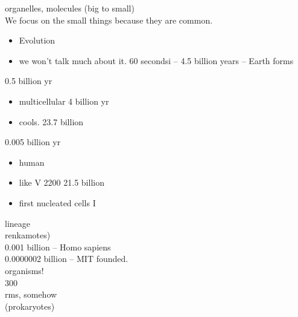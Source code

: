 organelles, molecules (big to small)\\
We focus on the small things because they are common.\\
\begin{itemize}\item  Evolution \item  we won't talk much about it. 60 secondsi
– 4.5 billion years – Earth forms
\end{itemize}
0.5 billion yr \begin{itemize}\item  multicellular
4 billion yr \item  cools.
23.7 billion
\end{itemize}
0.005 billion yr \begin{itemize}\item  human\item like
V 2200 21.5 billion \item  first nucleated cells I
\end{itemize}
lineage\\
renkamotes)\\
0.001 billion – Homo sapiens\\
0.0000002 billion – MIT founded.\\
organisms!\\
300\\
rms, somehow\\
(prokaryotes)\\
